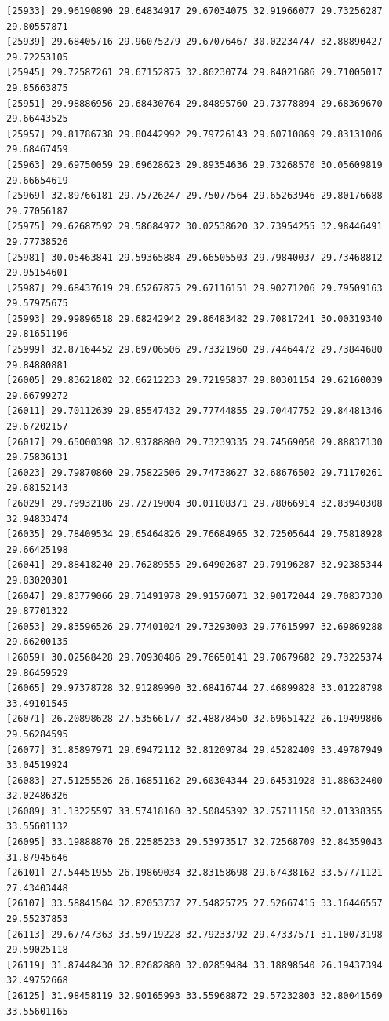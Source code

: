 \documentclass[
  letterpaper,
  DIV=11,
  numbers=noendperiod]{scrartcl}
\begin{document}
\begin{verbatim}
[25933] 29.96190890 29.64834917 29.67034075 32.91966077 29.73256287 29.80557871
[25939] 29.68405716 29.96075279 29.67076467 30.02234747 32.88890427 29.72253105
[25945] 29.72587261 29.67152875 32.86230774 29.84021686 29.71005017 29.85663875
[25951] 29.98886956 29.68430764 29.84895760 29.73778894 29.68369670 29.66443525
[25957] 29.81786738 29.80442992 29.79726143 29.60710869 29.83131006 29.68467459
[25963] 29.69750059 29.69628623 29.89354636 29.73268570 30.05609819 29.66654619
[25969] 32.89766181 29.75726247 29.75077564 29.65263946 29.80176688 29.77056187
[25975] 29.62687592 29.58684972 30.02538620 32.73954255 32.98446491 29.77738526
[25981] 30.05463841 29.59365884 29.66505503 29.79840037 29.73468812 29.95154601
[25987] 29.68437619 29.65267875 29.67116151 29.90271206 29.79509163 29.57975675
[25993] 29.99896518 29.68242942 29.86483482 29.70817241 30.00319340 29.81651196
[25999] 32.87164452 29.69706506 29.73321960 29.74464472 29.73844680 29.84880881
[26005] 29.83621802 32.66212233 29.72195837 29.80301154 29.62160039 29.66799272
[26011] 29.70112639 29.85547432 29.77744855 29.70447752 29.84481346 29.67202157
[26017] 29.65000398 32.93788800 29.73239335 29.74569050 29.88837130 29.75836131
[26023] 29.79870860 29.75822506 29.74738627 32.68676502 29.71170261 29.68152143
[26029] 29.79932186 29.72719004 30.01108371 29.78066914 32.83940308 32.94833474
[26035] 29.78409534 29.65464826 29.76684965 32.72505644 29.75818928 29.66425198
[26041] 29.88418240 29.76289555 29.64902687 29.79196287 32.92385344 29.83020301
[26047] 29.83779066 29.71491978 29.91576071 32.90172044 29.70837330 29.87701322
[26053] 29.83596526 29.77401024 29.73293003 29.77615997 32.69869288 29.66200135
[26059] 30.02568428 29.70930486 29.76650141 29.70679682 29.73225374 29.86459529
[26065] 29.97378728 32.91289990 32.68416744 27.46899828 33.01228798 33.49101545
[26071] 26.20898628 27.53566177 32.48878450 32.69651422 26.19499806 29.56284595
[26077] 31.85897971 29.69472112 32.81209784 29.45282409 33.49787949 33.04519924
[26083] 27.51255526 26.16851162 29.60304344 29.64531928 31.88632400 32.02486326
[26089] 31.13225597 33.57418160 32.50845392 32.75711150 32.01338355 33.55601132
[26095] 33.19888870 26.22585233 29.53973517 32.72568709 32.84359043 31.87945646
[26101] 27.54451955 26.19869034 32.83158698 29.67438162 33.57771121 27.43403448
[26107] 33.58841504 32.82053737 27.54825725 27.52667415 33.16446557 29.55237853
[26113] 29.67747363 33.59719228 32.79233792 29.47337571 31.10073198 29.59025118
[26119] 31.87448430 32.82682880 32.02859484 33.18898540 26.19437394 32.49752668
[26125] 31.98458119 32.90165993 33.55968872 29.57232803 32.80041569 33.55601165

\end{verbatim}
\end{document}
